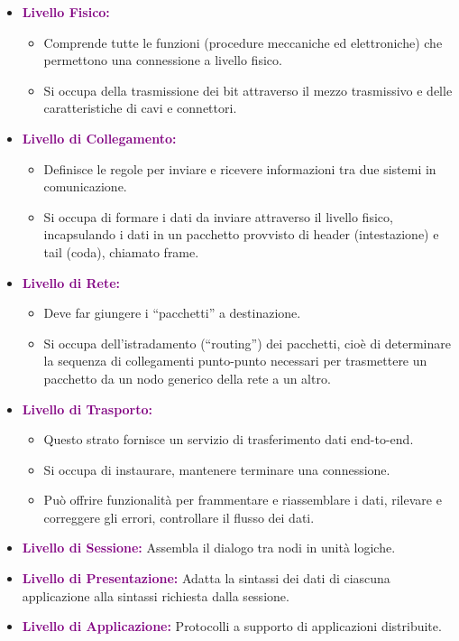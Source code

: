 \begin{itemize}
    \item \textbf{\textcolor{purple}{Livello Fisico:}} 
        \begin{itemize}
        \item Comprende tutte le funzioni (procedure meccaniche ed elettroniche) che permettono una connessione a livello fisico.
        \item Si occupa della trasmissione dei bit attraverso il mezzo trasmissivo e delle caratteristiche di cavi e connettori.
        \end{itemize}
    \item \textbf{\textcolor{purple}{Livello di Collegamento:}} 
        \begin{itemize}
            \item Definisce le regole per inviare e ricevere informazioni tra due sistemi in comunicazione.
            \item Si occupa di formare i dati da inviare attraverso il livello fisico, incapsulando i dati in un pacchetto provvisto di header (intestazione) e tail (coda), chiamato frame.
        \end{itemize}
    \item \textbf{\textcolor{purple}{Livello di Rete:}}
        \begin{itemize}
            \item Deve far giungere i “pacchetti” a destinazione.
            \item Si occupa dell’istradamento (“routing”) dei pacchetti, cioè di determinare la sequenza di collegamenti punto-punto necessari per trasmettere un pacchetto da un nodo generico della rete a un altro.
        \end{itemize}
    \item \textbf{\textcolor{purple}{Livello di Trasporto:}}    
        \begin{itemize}
            \item Questo strato fornisce un servizio di trasferimento dati end-to-end.
            \item Si occupa di instaurare, mantenere terminare una connessione.
            \item Può offrire funzionalità per frammentare e riassemblare i dati, rilevare e correggere gli errori, controllare il flusso dei dati.
        \end{itemize}
    \item \textbf{\textcolor{purple}{Livello di Sessione:}} Assembla il dialogo tra nodi in unità logiche.
    \item \textbf{\textcolor{purple}{Livello di Presentazione:}} Adatta la sintassi dei dati di ciascuna applicazione alla sintassi richiesta dalla sessione.
    \item \textbf{\textcolor{purple}{Livello di Applicazione:}} Protocolli a supporto di applicazioni distribuite.
\end{itemize}

